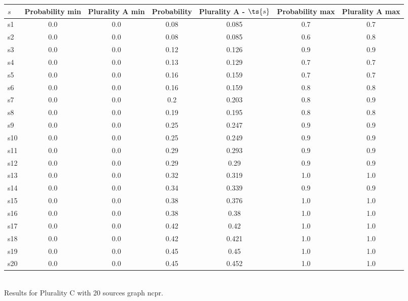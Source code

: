 \documentclass{article}
\begin{document}
\noindent\begin{tabular}{|l|c|c|c|c|c|c|}
\hline
$s$& Probability min & Plurality A min & Probability & Plurality A - $\ts{s}$ & Probability max & Plurality A max\\
\hline
s1 &0.0 & 0.0 & 0.08 & 0.085 & 0.7 & 0.7\\
\hline
s2 &0.0 & 0.0 & 0.08 & 0.085 & 0.6 & 0.8\\
\hline
s3 &0.0 & 0.0 & 0.12 & 0.126 & 0.9 & 0.9\\
\hline
s4 &0.0 & 0.0 & 0.13 & 0.129 & 0.7 & 0.7\\
\hline
s5 &0.0 & 0.0 & 0.16 & 0.159 & 0.7 & 0.7\\
\hline
s6 &0.0 & 0.0 & 0.16 & 0.159 & 0.8 & 0.8\\
\hline
s7 &0.0 & 0.0 & 0.2 & 0.203 & 0.8 & 0.9\\
\hline
s8 &0.0 & 0.0 & 0.19 & 0.195 & 0.8 & 0.8\\
\hline
s9 &0.0 & 0.0 & 0.25 & 0.247 & 0.9 & 0.9\\
\hline
s10 &0.0 & 0.0 & 0.25 & 0.249 & 0.9 & 0.9\\
\hline
s11 &0.0 & 0.0 & 0.29 & 0.293 & 0.9 & 0.9\\
\hline
s12 &0.0 & 0.0 & 0.29 & 0.29 & 0.9 & 0.9\\
\hline
s13 &0.0 & 0.0 & 0.32 & 0.319 & 1.0 & 1.0\\
\hline
s14 &0.0 & 0.0 & 0.34 & 0.339 & 0.9 & 0.9\\
\hline
s15 &0.0 & 0.0 & 0.38 & 0.376 & 1.0 & 1.0\\
\hline
s16 &0.0 & 0.0 & 0.38 & 0.38 & 1.0 & 1.0\\
\hline
s17 &0.0 & 0.0 & 0.42 & 0.42 & 1.0 & 1.0\\
\hline
s18 &0.0 & 0.0 & 0.42 & 0.421 & 1.0 & 1.0\\
\hline
s19 &0.0 & 0.0 & 0.45 & 0.45 & 1.0 & 1.0\\
\hline
s20 &0.0 & 0.0 & 0.45 & 0.452 & 1.0 & 1.0\\
\hline
\end{tabular}\\

\noindent Results for Plurality C with 20 sources graph ncpr.
\end{document}
